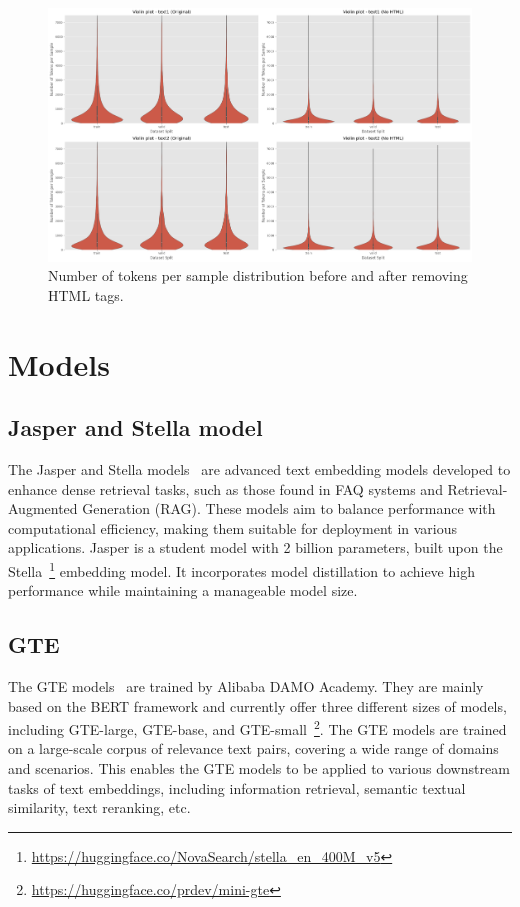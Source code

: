 \documentclass[
	a4paper, %
	10pt, %
	unnumberedsections, %
	twoside, %
]{LTJournalArticle}
\begin{document}
\begin{figure}[!h]
    \centering
    \includegraphics[width=0.75\linewidth]{violin.png}
    \caption{Number of tokens per sample distribution before and after removing HTML tags.}
    \label{fig:enter-label}
\end{figure}
\section{Models}

\subsection{Jasper and Stella model}
The Jasper and Stella models~\autocite{stella} are advanced text embedding models developed to enhance dense retrieval tasks, such as those found in FAQ systems and Retrieval-Augmented Generation (RAG). These models aim to balance performance with computational efficiency, making them suitable for deployment in various applications. Jasper is a student model with 2 billion parameters, built upon the Stella~\footnote{\url{https://huggingface.co/NovaSearch/stella_en_400M_v5}} embedding model. It incorporates model distillation to achieve high performance while maintaining a manageable model size.

\subsection{GTE}
The GTE models~\autocite{gte} are trained by Alibaba DAMO Academy. They are mainly based on the BERT framework and currently offer three different sizes of models, including GTE-large, GTE-base, and GTE-small~\footnote{\url{https://huggingface.co/prdev/mini-gte}}. The GTE models are trained on a large-scale corpus of relevance text pairs, covering a wide range of domains and scenarios. This enables the GTE models to be applied to various downstream tasks of text embeddings, including information retrieval, semantic textual similarity, text reranking, etc.
\end{document}
